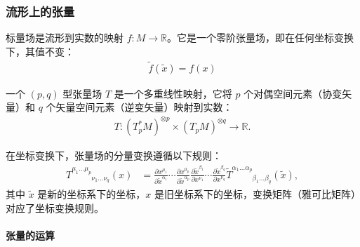 \subsubsection{流形上的张量}


\begin{definition}[标量场]
  标量场是流形到实数的映射 \( f: M \to \mathbb{R} \)。它是一个零阶张量场，即在任何坐标变换下，其值不变：
  \begin{align}
    \widetilde{f}(\widetilde{x}) = f(x)
  \end{align}
\end{definition}
\begin{definition}[张量场]
  一个 \( (p, q) \) 型张量场 \( T \) 是一个多重线性映射，它将 \( p \) 个对偶空间元素（协变矢量）和 \( q \) 个矢量空间元素（逆变矢量）映射到实数：
  \begin{align}
    T: (T^*_p M)^{\otimes p} \times (T_p M)^{\otimes q} \to \mathbb{R}.
  \end{align}
\end{definition}
在坐标变换下，张量场的分量变换遵循以下规则：
\begin{align}
  T^{\mu_1 \dots \mu_p}_{\phantom{\mu_1 \dots \mu_p} \nu_1 \dots \nu_q}(x)
  &= \frac{\partial x^{\mu_1}}{\partial \widetilde{x}^{\alpha_1}} \cdots \frac{\partial x^{\mu_p}}{\partial \widetilde{x}^{\alpha_p}} \frac{\partial \widetilde{x}^{\beta_1}}{\partial x^{\nu_1}} \cdots \frac{\partial \widetilde{x}^{\beta_q}}{\partial x^{\nu_q}} 
  \widetilde{T}^{\alpha_1 \dots \alpha_p}_{\phantom{\alpha_1 \dots \alpha_p} \beta_1 \dots \beta_q}(\widetilde{x}),
  \label{eq:tensor_trans}
\end{align}
其中 \( \widetilde{x} \) 是新的坐标系下的坐标，\( x \) 是旧坐标系下的坐标，变换矩阵（雅可比矩阵）对应了坐标变换规则。


    \paragraph{张量的运算}


